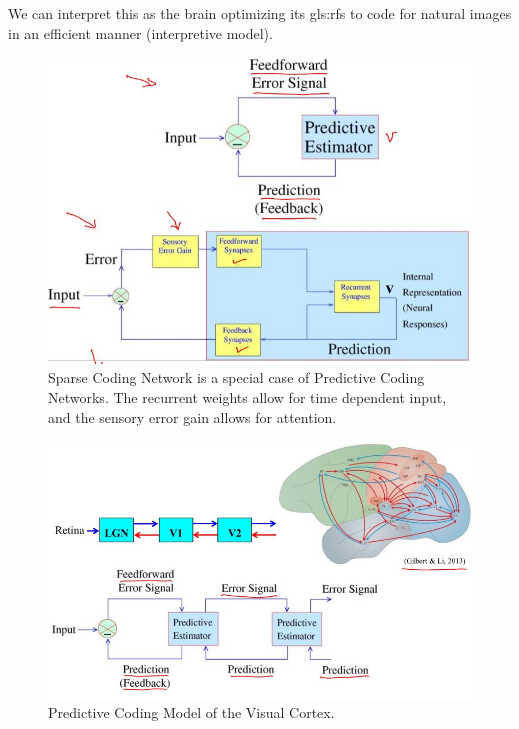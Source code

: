 \documentclass[]{article}
\begin{document}
We can interpret this as the brain optimizing its \glspl{gls:rf} to code for natural images in an efficient manner (interpretive model).
\begin{figure}[H]
	\begin{center}
		\caption[Sparse Coding: a special case of Predictive Coding]{Sparse Coding Network is a special case of Predictive Coding Networks. The recurrent weights allow for time dependent input, and the sensory error gain allows for attention\cite{rao1999optimal,rao1999predictive}.}
		\includegraphics[width=\textwidth]{sparse-coding-predictive-coding}
	\end{center}
\end{figure}

\begin{figure}[H]
	\begin{center}
		\caption[Predictive Coding Model of
		the Visual Cortex]{Predictive Coding Model of
			the Visual Cortex\cite{rao1999predictive,gilbert2013top}.  }
		\includegraphics[width=\textwidth]{predictive-coding-visual-cortex}
	\end{center}
\end{figure}
\end{document}
